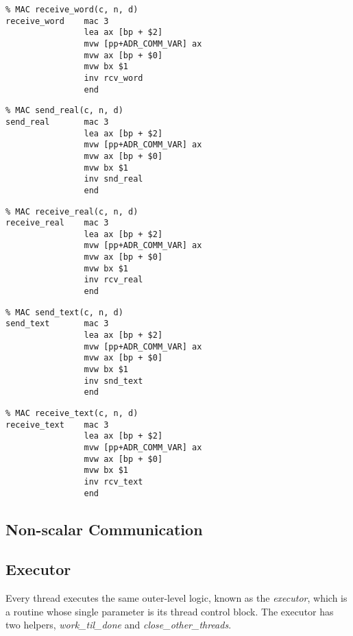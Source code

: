 {\small
\begin{verbatim}
% MAC receive_word(c, n, d)
receive_word    mac 3
                lea ax [bp + $2]
                mvw [pp+ADR_COMM_VAR] ax
                mvw ax [bp + $0]
                mvw bx $1
                inv rcv_word
                end
\end{verbatim}}

{\small
\begin{verbatim}
% MAC send_real(c, n, d)
send_real       mac 3
                lea ax [bp + $2]
                mvw [pp+ADR_COMM_VAR] ax
                mvw ax [bp + $0]
                mvw bx $1
                inv snd_real
                end
\end{verbatim}}

{\small
\begin{verbatim}
% MAC receive_real(c, n, d)
receive_real    mac 3
                lea ax [bp + $2]
                mvw [pp+ADR_COMM_VAR] ax
                mvw ax [bp + $0]
                mvw bx $1
                inv rcv_real
                end
\end{verbatim}}

{\small
\begin{verbatim}
% MAC send_text(c, n, d)
send_text       mac 3
                lea ax [bp + $2]
                mvw [pp+ADR_COMM_VAR] ax
                mvw ax [bp + $0]
                mvw bx $1
                inv snd_text
                end
\end{verbatim}}

{\small
\begin{verbatim}
% MAC receive_text(c, n, d)
receive_text    mac 3
                lea ax [bp + $2]
                mvw [pp+ADR_COMM_VAR] ax
                mvw ax [bp + $0]
                mvw bx $1
                inv rcv_text
                end
\end{verbatim}}



\subsection{Non-scalar Communication}


\subsection{Executor}\label{abstractexecutor}
Every thread executes the same outer-level logic, known as the \emph{executor}, which is a routine whose single parameter is its thread control block.
The executor has two helpers, \emph{work\_til\_done} and \emph{close\_other\_threads}.


